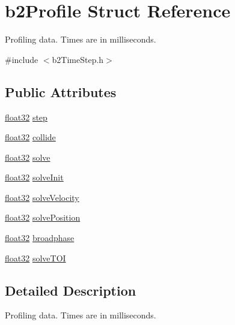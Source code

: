 \hypertarget{structb2_profile}{}\section{b2\+Profile Struct Reference}
\label{structb2_profile}


Profiling data. Times are in milliseconds.  




{\ttfamily \#include $<$b2\+Time\+Step.\+h$>$}

\subsection*{Public Attributes}
\begin{DoxyCompactItemize}
\item 
\mbox{\hyperlink{b2_settings_8h_aacdc525d6f7bddb3ae95d5c311bd06a1}{float32}} \mbox{\hyperlink{structb2_profile_a5b93de1d56902224868beacc478b9863}{step}}
\item 
\mbox{\hyperlink{b2_settings_8h_aacdc525d6f7bddb3ae95d5c311bd06a1}{float32}} \mbox{\hyperlink{structb2_profile_af827d9e54f7a4e94d0a023e18466b960}{collide}}
\item 
\mbox{\hyperlink{b2_settings_8h_aacdc525d6f7bddb3ae95d5c311bd06a1}{float32}} \mbox{\hyperlink{structb2_profile_afbefc05f05ec8bfd6cb2011929688a0b}{solve}}
\item 
\mbox{\hyperlink{b2_settings_8h_aacdc525d6f7bddb3ae95d5c311bd06a1}{float32}} \mbox{\hyperlink{structb2_profile_a010110900c27ccc88cd5e23b0e12e96e}{solve\+Init}}
\item 
\mbox{\hyperlink{b2_settings_8h_aacdc525d6f7bddb3ae95d5c311bd06a1}{float32}} \mbox{\hyperlink{structb2_profile_ae4d29a19b38de81621bccdbf75595233}{solve\+Velocity}}
\item 
\mbox{\hyperlink{b2_settings_8h_aacdc525d6f7bddb3ae95d5c311bd06a1}{float32}} \mbox{\hyperlink{structb2_profile_a78e22d104226863492ebab9ea30a9ed9}{solve\+Position}}
\item 
\mbox{\hyperlink{b2_settings_8h_aacdc525d6f7bddb3ae95d5c311bd06a1}{float32}} \mbox{\hyperlink{structb2_profile_a6bd556e43a6fa3853adad9fd71e56b44}{broadphase}}
\item 
\mbox{\hyperlink{b2_settings_8h_aacdc525d6f7bddb3ae95d5c311bd06a1}{float32}} \mbox{\hyperlink{structb2_profile_a74e8ea0c6ca39250d639ec94b69a803e}{solve\+T\+OI}}
\end{DoxyCompactItemize}


\subsection{Detailed Description}
Profiling data. Times are in milliseconds. 

